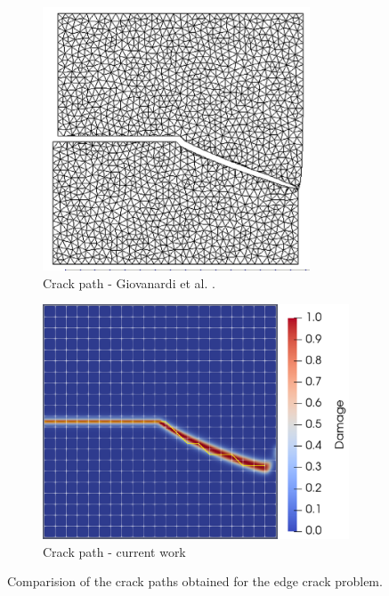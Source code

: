 \begin{figure}[h]
    \begin{subfigure}{.45\textwidth}
      \centering
      \includegraphics[width=0.765\linewidth]{Chapter4/figures/nonplanar/curved_crack_result_bianca.png}
      \caption{Crack path - Giovanardi et al. \cite{giovanardi2017hybrid}.}
      \label{fig:reference result}
    \end{subfigure}%
    \begin{subfigure}{.54\textwidth}
      \centering
      \includegraphics[width=0.83\linewidth]{Chapter4/figures/nonplanar/nonplanar_example.png}
      \caption{Crack path - current work}
      \label{fig:crack_path}
    \end{subfigure}%
      \caption{Comparision of the crack paths obtained for the edge crack problem.} 
      \label{fig:nonplanar_example}
\end{figure}